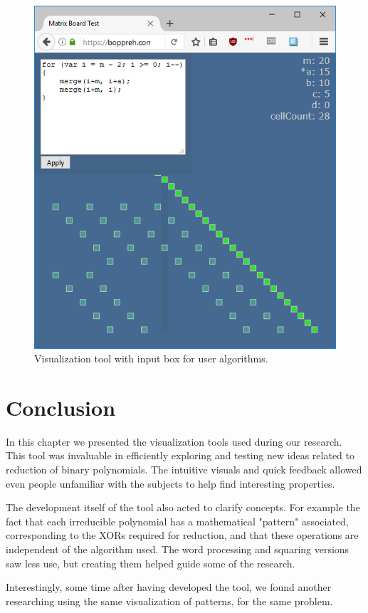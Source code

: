 \begin{figure}
  \caption{Visualization tool with input box for user algorithms.}
  \label{fig:source}
  \includegraphics[width = .55\columnwidth]{figures/source.png}
\end{figure}


\section{Conclusion} \label{section:visual:conclusion}

In this chapter we presented the visualization tools used during our research. This tool was invaluable in efficiently exploring and testing new ideas related to reduction of binary polynomials. The intuitive visuals and quick feedback allowed even people unfamiliar with the subjects to help find interesting properties.

The development itself of the tool also acted to clarify concepts. For example the fact that each irreducible polynomial has a mathematical "pattern" associated, corresponding to the XORs required for reduction, and that these operations are independent of the algorithm used. The word processing and squaring versions saw less use, but creating them helped guide some of the research.

Interestingly, some time after having developed the tool, we found another researching using the same visualization of patterns, for the same problem.\cite{paper com imagens dos padroes}